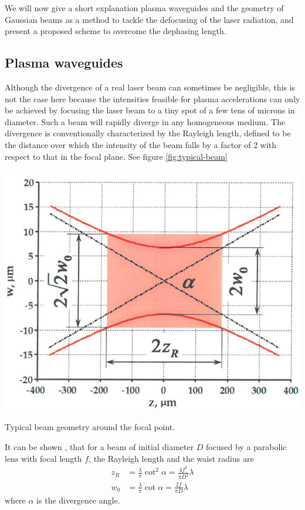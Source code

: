 \documentclass[justified,nofonts,nobib,openany]{tufte-book}
\begin{document}
We will now give a short explanation plasma waveguides and the geometry of Gaussian beams as a method to tackle the defocusing of the laser radiation, and present a proposed scheme to overcome the dephasing length.

\subsection{Plasma waveguides}
Although the divergence of a real laser beam can sometimes be negligible, this is not the case here because the intensities feasible for plasma accelerations can only be achieved by focusing the laser beam to a tiny spot of a few tens of microns in diameter. Such a beam will rapidly diverge in any homogeneous medium. The divergence is conventionally characterized by the Rayleigh length, defined to be the distance over which the intensity of the beam falls by a factor of 2 with respect to that in the focal plane. See figure \ref{fig:typical-beam}
\begin{marginfigure}
\includegraphics[width=\marginparwidth]{figures/beam-geometry.PNG}
\caption{Typical beam geometry around the focal point.}
\label{fig:typical-beam}
\end{marginfigure}
It can be shown \cite{Saleh2019BeamOptics}, that for a beam of initial diameter $D$ focused by a parabolic lens with focal length $f$, the Rayleigh length and the waist radius are
\begin{equation}
\begin{split}
z_R & = \frac{\lambda}{\pi} \cot^2\alpha = \frac{4f^2}{\pi D^2}\lambda
\\
w_0 & = \frac{\lambda}{\pi}\cot \alpha=\frac{2f}{\pi D}\lambda
\end{split}
\end{equation}
where $\alpha$ is the divergence angle.
\end{document}
